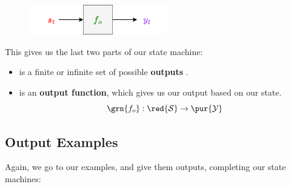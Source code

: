         \begin{figure}[H]
            \centering
            \includegraphics[width=60mm,scale=0.4]{images/rnn_images/output_diagram.png}
        \end{figure}

        This gives us the last two parts of our state machine:
            
        \begin{itemize}
            \item {} is a finite or infinite set of possible \textbf{outputs} .
            
            \item {} is an \textbf{output function}, which gives us our output based on our state.
                \begin{equation}
                    \grn{f_o}: \red{\mathcal{S}} \rightarrow \pur{\mathcal{Y}}
                \end{equation}
        \end{itemize}


    \subsection{Output Examples}
        
        Again, we go to our examples, and give them outputs, completing our state machines:
        
